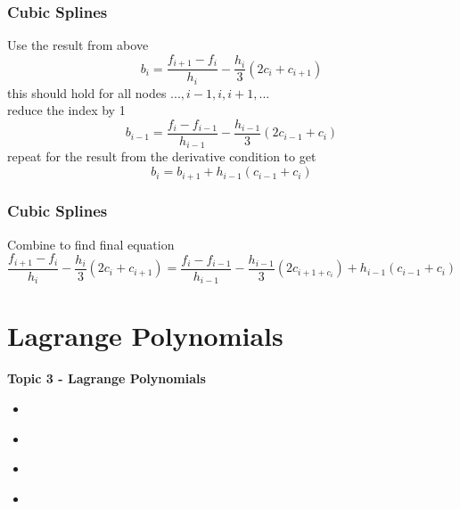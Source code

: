 \documentclass[fleqn]{beamer} %
\newcommand{\sectionIVtitle}{Lagrange Polynomials}
\newcommand{\sectionIIIsubsectionIVtitle}{Cubic Splines}
\newcommand{\sectionIVsubsectionItitle}{}
\newcommand{\sectionIVsubsectionIItitle}{}
\newcommand{\sectionIVsubsectionIIItitle}{}
\newcommand{\sectionIVsubsectionIVtitle}{}
\begin{document}
      \begin{frame}
				\frametitle{\sectionIIIsubsectionIVtitle} \small
				\bigskip
        Use the result from above
        \[b_i=\frac{f_{i+1}-f_i}{h_i}-\frac{h_i}{3}\left(2c_i+c_{i+1}\right)\]
        this should hold for all nodes $...,i-1, i, i+1,...$ \\
        reduce the index by 1
        \[b_{i-1}=\frac{f_i-f_{i-1}}{h_{i-1}}-\frac{h_{i-1}}{3}\left(2c_{i-1}+c_i\right)\]
        repeat for the result from the derivative condition to get
        \[b_i=b_{i+1}+h_{i-1}\left(c_{i-1}+c_i\right)\] 
				\btVFill
			\end{frame}	
	
      \begin{frame}
				\frametitle{\sectionIIIsubsectionIVtitle} \small
				\bigskip
        Combine to find final equation
        \[\frac{f_{i+1}-{f_i}}{h_i}-\frac{h_i}{3}\left(2c_i+c_{i+1}\right)=\frac{f_i-f_{i-1}}{h_{i-1}}-\frac{h_{i-1}}{3}\left(2c_{i+1+c_i}\right)+h_{i-1}\left(c_{i-1}+c_i\right)\]
				\btVFill
			\end{frame}	

\section{\sectionIVtitle}\label{sectionIV}

		\begin{frame}
			\large \textbf{Topic 3 - \sectionIVtitle} \vspace{3mm}\\

			\begin{itemize}
				\item \hyperlink{sectionIVsubsectionI}{\sectionIVsubsectionItitle} \vspc %
				\item \hyperlink{sectionIVsubsectionII}{\sectionIVsubsectionIItitle} \vspc %
				\item \hyperlink{sectionIVsubsectionIII}{\sectionIVsubsectionIIItitle} \vspc %
				\item \hyperlink{sectionIVsubsectionIV}{\sectionIVsubsectionIVtitle} \vspc %
			\end{itemize}

		\end{frame}

		\subsection{\sectionIVsubsectionItitle}\label{sectionIVsubsectionI}
\end{document}
